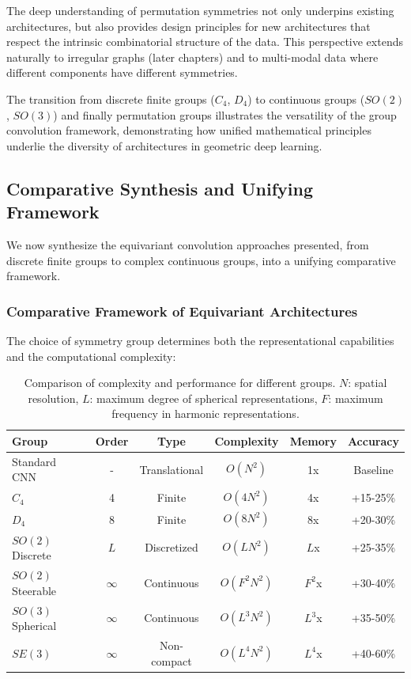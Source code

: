 The deep understanding of permutation symmetries not only underpins existing architectures, but also provides design principles for new architectures that respect the intrinsic combinatorial structure of the data. This perspective extends naturally to irregular graphs (later chapters) and to multi-modal data where different components have different symmetries.

The transition from discrete finite groups ($C_4$, $D_4$) to continuous groups ($SO(2)$, $SO(3)$) and finally permutation groups illustrates the versatility of the group convolution framework, demonstrating how unified mathematical principles underlie the diversity of architectures in geometric deep learning.

\subsection{Comparative Synthesis and Unifying Framework}\label{subsec:sintesis_comparativa_gcnn}

We now synthesize the equivariant convolution approaches presented, from discrete finite groups to complex continuous groups, into a unifying comparative framework.

\subsubsection{Comparative Framework of Equivariant Architectures}\label{subsubsec:marco_comparativo_arquitecturas}

The choice of symmetry group determines both the representational capabilities and the computational complexity:

\begin{table}[h]
\centering
\small
\begin{tabular}{|l|c|c|c|c|c|}
\hline
\textbf{Group} & \textbf{Order} & \textbf{Type} & \textbf{Complexity} & \textbf{Memory} & \textbf{Accuracy} \\
\hline
Standard CNN & - & Translational & $O(N^2)$ & 1x & Baseline \\
$C_4$ & 4 & Finite & $O(4N^2)$ & 4x & +15-25\% \\
$D_4$ & 8 & Finite & $O(8N^2)$ & 8x & +20-30\% \\
$SO(2)$ Discrete & $L$ & Discretized & $O(LN^2)$ & $L$x & +25-35\% \\
$SO(2)$ Steerable & $\infty$ & Continuous & $O(F^2N^2)$ & $F^2$x & +30-40\% \\
$SO(3)$ Spherical & $\infty$ & Continuous & $O(L^3N^2)$ & $L^3$x & +35-50\% \\
$SE(3)$ & $\infty$ & Non-compact & $O(L^4N^2)$ & $L^4$x & +40-60\% \\
\hline
\end{tabular}
\caption{Comparison of complexity and performance for different groups. $N$: spatial resolution, $L$: maximum degree of spherical representations, $F$: maximum frequency in harmonic representations.}
\label{tab:group_complexity_comparison}
\end{table}


